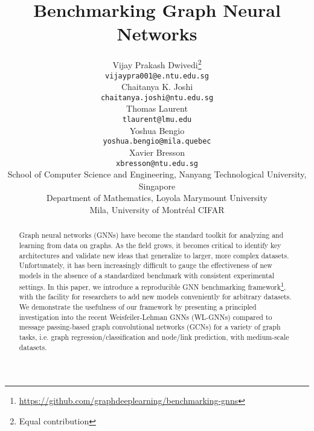 \documentclass{article}
\title{Benchmarking Graph Neural Networks}
\author{Vijay Prakash Dwivedi\thanks{Equal contribution} \\
  \texttt{vijaypra001@e.ntu.edu.sg} \\
  \And
  Chaitanya K. Joshi\footnotemark[1] \\
  \texttt{chaitanya.joshi@ntu.edu.sg} \\
  \AND
  Thomas Laurent \\
  \texttt{tlaurent@lmu.edu} \\
  \And
  Yoshua Bengio \\
  \texttt{yoshua.bengio@mila.quebec} \\
  \And
  Xavier Bresson \\
  \texttt{xbresson@ntu.edu.sg} \\
  \AND
  {\normalfont  School of Computer Science and Engineering, Nanyang Technological University, Singapore} \\
   Department of Mathematics, Loyola Marymount University \\ 
   Mila, University of Montr\'eal \hspace{0.1cm}  CIFAR
}
\begin{document}
\maketitle



\begin{abstract}
Graph neural networks (GNNs) have become the standard toolkit for analyzing and learning from data on graphs. As the field grows, it becomes critical to identify key architectures and validate new ideas that generalize to larger, more complex datasets. Unfortunately, it has been increasingly difficult to gauge the effectiveness  of new models in the absence of a standardized benchmark with consistent experimental settings. In this paper, we introduce a reproducible GNN benchmarking framework\footnote{\small{\url{https://github.com/graphdeeplearning/benchmarking-gnns}}},
with the facility for researchers to add new models conveniently for arbitrary datasets. We demonstrate the usefulness of our framework by presenting a principled investigation into the recent Weisfeiler-Lehman GNNs (WL-GNNs) compared to message passing-based graph convolutional networks (GCNs) for a variety of graph tasks, i.e. graph regression/classification and node/link prediction, with medium-scale datasets.





\end{abstract}
\end{document}
